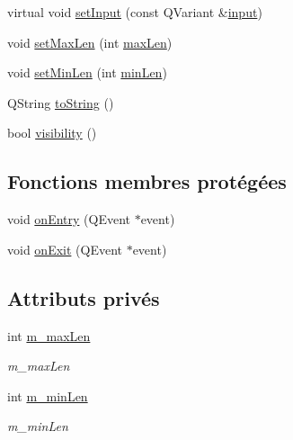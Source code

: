 \begin{DoxyCompactItemize}
\item 
virtual void \hyperlink{classSH__QuestionState_ab40b6202090d1afcc965e124b2deb88a}{set\-Input} (const Q\-Variant \&\hyperlink{classSH__InOutState_a8e1b78069343122df7713624a1a5a100}{input})
\item 
void \hyperlink{classSH__StringQuestionState_a7b8ca17302c0953e0ce4a5412f3b96b5}{set\-Max\-Len} (int \hyperlink{classSH__StringQuestionState_a6dce486c3484c28406b234b5f2f91288}{max\-Len})
\item 
void \hyperlink{classSH__StringQuestionState_adf29a14672e2913642f75e61bfed5818}{set\-Min\-Len} (int \hyperlink{classSH__StringQuestionState_a24a95c3ce141e5e26f789720c59d2d3e}{min\-Len})
\item 
Q\-String \hyperlink{classSH__GenericState_a7779babbb40f3f8faa71112204d9804f}{to\-String} ()
\item 
bool \hyperlink{classSH__InOutState_a3a18752c4122c26a2ebf38310c9c1b75}{visibility} ()
\end{DoxyCompactItemize}
\subsection*{Fonctions membres protégées}
\begin{DoxyCompactItemize}
\item 
void \hyperlink{classSH__GenericState_a68c67ef95738e01cd34cd5926f4932fb}{on\-Entry} (Q\-Event $\ast$event)
\item 
void \hyperlink{classSH__GenericState_a7f7863859318c70c9b734be5bf5510b0}{on\-Exit} (Q\-Event $\ast$event)
\end{DoxyCompactItemize}
\subsection*{Attributs privés}
\begin{DoxyCompactItemize}
\item 
int \hyperlink{classSH__StringQuestionState_ac001a12ae5939116282ec21920a8e7d1}{m\-\_\-max\-Len}
\begin{DoxyCompactList}\small\item\em m\-\_\-max\-Len \end{DoxyCompactList}\item 
int \hyperlink{classSH__StringQuestionState_a0efb97212b868551f4d46487fa3b0464}{m\-\_\-min\-Len}
\begin{DoxyCompactList}\small\item\em m\-\_\-min\-Len \end{DoxyCompactList}\end{DoxyCompactItemize}


